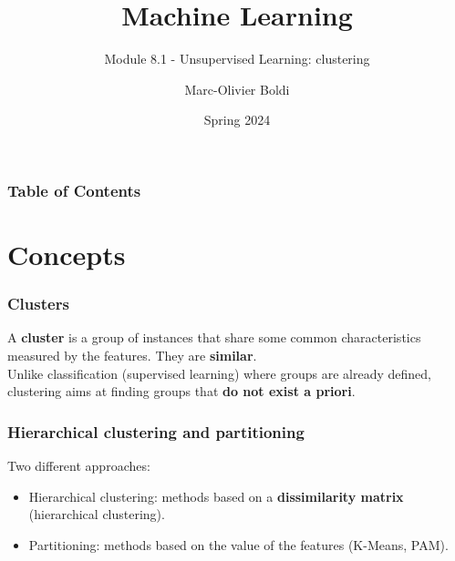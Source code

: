 
\title{Machine Learning}
\subtitle{Module 8.1 - Unsupervised Learning: clustering}
\author[MOB]{Marc-Olivier Boldi}
\date[Spring 2024]{Spring 2024}

\begin{frame}
  \titlepage
\end{frame}
\begin{frame}
\frametitle{Table of Contents}
	\tableofcontents
\end{frame}
\section{Concepts}
\begin{frame}
\frametitle{Clusters}
A {\bf cluster} is a group of instances that share some common characteristics measured by the features. They are {\bf similar}. \\ 
\vspace{0.3cm}
Unlike classification (supervised learning) where groups are already defined, clustering aims at finding groups that {\bf do not exist a priori}.
\end{frame}
\begin{frame}
\frametitle{Hierarchical clustering and partitioning}
Two different approaches: 
\begin{itemize} 
\item Hierarchical clustering: methods based on a {\bf dissimilarity matrix} (hierarchical clustering).
\item Partitioning: methods based on the value of the features (K-Means, PAM). 
\end{itemize}
\end{frame}
